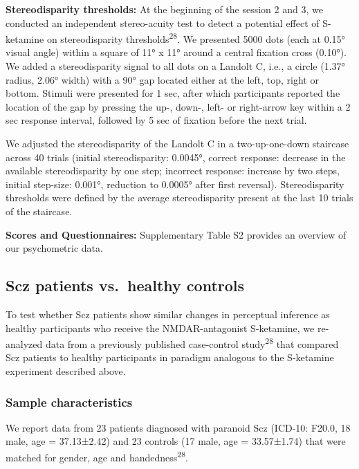 \documentclass[
]{article}
\begin{document}
\textbf{Stereodisparity thresholds:} At the beginning of the session 2
and 3, we conducted an independent stereo-acuity test to detect a
potential effect of S-ketamine on stereodisparity
thresholds\textsuperscript{28}. We presented 5000 dots (each at 0.15°
visual angle) within a square of 11° x 11° around a central fixation
cross (0.10°). We added a stereodisparity signal to all dots on a
Landolt C, i.e., a circle (1.37° radius, 2.06° width) with a 90° gap
located either at the left, top, right or bottom. Stimuli were presented
for 1 sec, after which participants reported the location of the gap by
pressing the up-, down-, left- or right-arrow key within a 2 sec
response interval, followed by 5 sec of fixation before the next trial.

We adjusted the stereodisparity of the Landolt C in a two-up-one-down
staircase across 40 trials (initial stereodisparity: 0.0045°, correct
response: decrease in the available stereodisparity by one step;
incorrect response: increase by two steps, initial step-size: 0.001°,
reduction to 0.0005° after first reversal). Stereodisparity thresholds
were defined by the average stereodisparity present at the last 10
trials of the staircase.

\textbf{Scores and Questionnaires:} Supplementary Table S2 provides an
overview of our psychometric data.

\subsection{Scz patients vs.~healthy
controls}\label{scz-patients-vs.-healthy-controls}

To test whether Scz patients show similar changes in perceptual
inference as healthy participants who receive the NMDAR-antagonist
S-ketamine, we re-analyzed data from a previously published case-control
study\textsuperscript{28} that compared Scz patients to healthy
participants in paradigm analogous to the S-ketamine experiment
described above.

\subsubsection{Sample characteristics}\label{sample-characteristics-1}

We report data from 23 patients diagnosed with paranoid Scz (ICD-10:
F20.0, 18 male, age = 37.13±2.42) and 23 controls (17 male, age =
33.57±1.74) that were matched for gender, age and
handedness\textsuperscript{28}.
\end{document}
